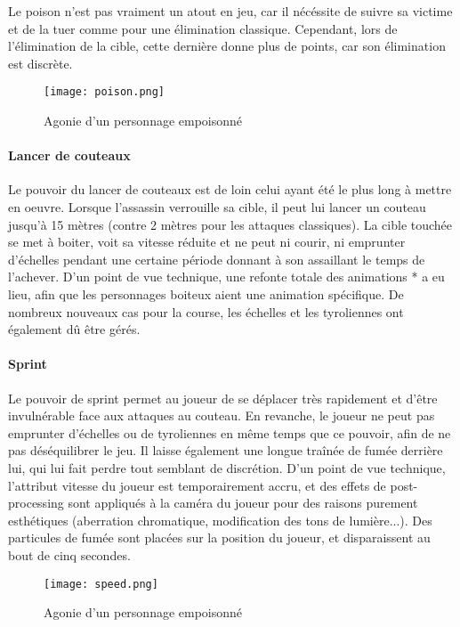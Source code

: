 			Le poison n'est pas vraiment un atout en jeu, car il nécéssite de suivre sa victime et de la tuer comme pour une 
			élimination classique. Cependant, lors de l'élimination de la cible, cette dernière donne plus de points, car son 
			élimination est discrète.
			
			\begin{figure}[hbt!]
				\centering
				\texttt{[image: poison.png]}
				\caption{Agonie d'un personnage empoisonné}
			\end{figure}
			\FloatBarrier

		
		\paragraph{Lancer de couteaux}

			Le pouvoir du lancer de couteaux est de loin celui ayant été le plus long à mettre en oeuvre. Lorsque l'assassin 
			verrouille sa cible, il peut lui lancer un couteau jusqu'à 15 mètres (contre 2 mètres pour les attaques classiques).
			La cible touchée se met à boiter, voit sa vitesse réduite et ne peut ni courir, ni emprunter d'échelles pendant une certaine 
			période donnant à son assaillant le temps de l'achever. D'un point de vue technique, une refonte totale des animations *
			a eu lieu, afin que les personnages boiteux aient une animation spécifique. De nombreux nouveaux cas pour la course, les 
			échelles et les tyroliennes ont également dû être gérés. 


		\paragraph{Sprint}
	
			Le pouvoir de sprint permet au joueur de se déplacer très rapidement et d'être invulnérable face aux attaques 
			au couteau. En revanche, le joueur ne peut pas emprunter d'échelles ou de tyroliennes en même temps que ce pouvoir, afin 
			de ne pas déséquilibrer le jeu. Il laisse également une longue traînée de fumée derrière lui, qui lui fait perdre 
			tout semblant de discrétion. D'un point de vue technique, l'attribut vitesse du joueur est temporairement accru, 
			et des effets de post-processing sont appliqués à la caméra du joueur pour des raisons purement esthétiques (aberration 
			chromatique, modification des tons de lumière...). Des particules de fumée sont placées sur la position du joueur, et 
			disparaissent au bout de cinq secondes.

			\begin{figure}[hbt!]
				\centering
				\texttt{[image: speed.png]}
				\caption{Agonie d'un personnage empoisonné}
			\end{figure}
			\FloatBarrier
		
		

